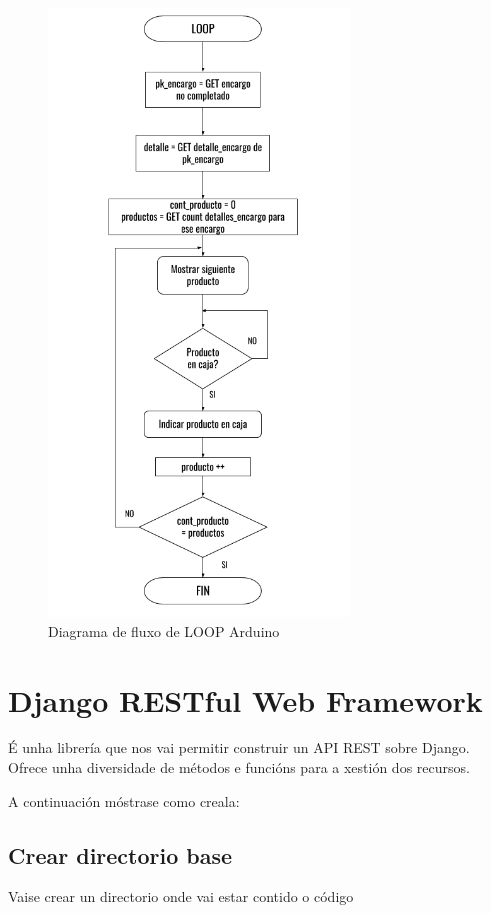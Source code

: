 \documentclass[11pt,twoside]{book}
\begin{document}
\begin{figure}[H]
	\begin{center}
		\includegraphics[width=8cm]{images/diagrama_flujo_loop.png}
	\end{center}
	\caption{Diagrama de fluxo de LOOP Arduino}
	\label{fig:FluxoLOOP}
\end{figure}
 

\section{Django RESTful Web Framework}

É unha librería que nos vai permitir construir un API REST sobre Django. Ofrece unha diversidade de métodos e funcións para a xestión dos recursos.

A continuación móstrase como creala:

\subsection{Crear directorio base}

Vaise crear un directorio onde vai estar contido o código
\end{document}

